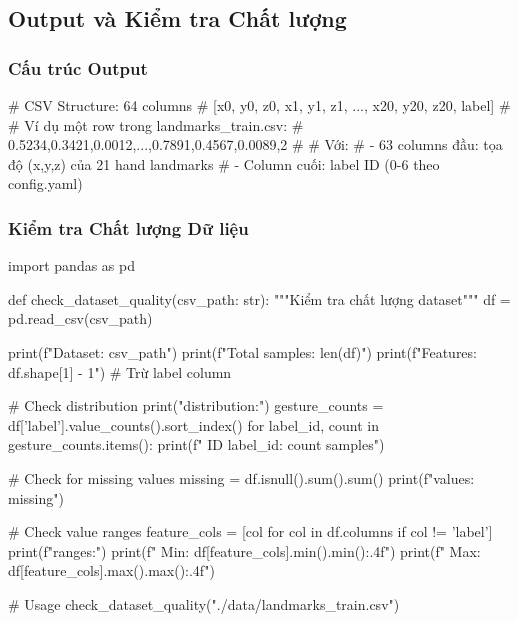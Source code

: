 \subsection{Output và Kiểm tra Chất lượng}

\subsubsection{Cấu trúc Output}

\begin{aivncodebox}
\begin{python}
# CSV Structure: 64 columns
# [x0, y0, z0, x1, y1, z1, ..., x20, y20, z20, label]
# 
# Ví dụ một row trong landmarks_train.csv:
# 0.5234,0.3421,0.0012,...,0.7891,0.4567,0.0089,2
#
# Với:
# - 63 columns đầu: tọa độ (x,y,z) của 21 hand landmarks
# - Column cuối: label ID (0-6 theo config.yaml)
\end{python}
\end{aivncodebox}

\subsubsection{Kiểm tra Chất lượng Dữ liệu}

\begin{aivncodebox}
\begin{python}
import pandas as pd

def check_dataset_quality(csv_path: str):
    """Kiểm tra chất lượng dataset"""
    df = pd.read_csv(csv_path)
    
    print(f"Dataset: {csv_path}")
    print(f"Total samples: {len(df)}")
    print(f"Features: {df.shape[1] - 1}")  # Trừ label column
    
    # Check distribution
    print("\nGesture distribution:")
    gesture_counts = df['label'].value_counts().sort_index()
    for label_id, count in gesture_counts.items():
        print(f"  ID {label_id}: {count} samples")
    
    # Check for missing values
    missing = df.isnull().sum().sum()
    print(f"\nMissing values: {missing}")
    
    # Check value ranges
    feature_cols = [col for col in df.columns if col != 'label']
    print(f"\nFeature ranges:")
    print(f"  Min: {df[feature_cols].min().min():.4f}")
    print(f"  Max: {df[feature_cols].max().max():.4f}")

# Usage
check_dataset_quality("./data/landmarks_train.csv")
\end{python}
\end{aivncodebox}

